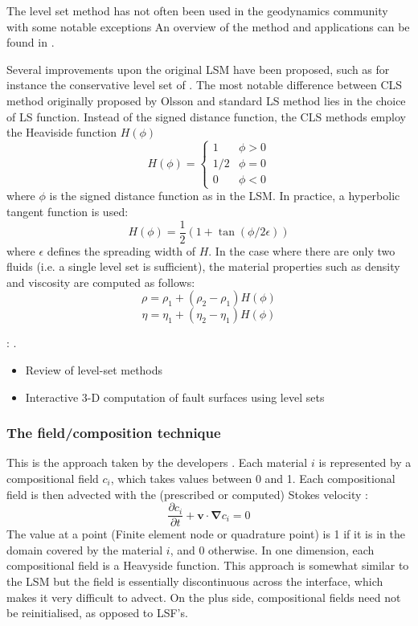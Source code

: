 The level set method has not often been used in the geodynamics 
community with some notable exceptions 
\cite{bomh06,bomh07,habm07,grbh07,zlfd08,hagr10,sunh10,suhe10,hitg14}
An overview of the method and applications can
be found in \cite{osfe01}.

Several improvements upon the original LSM have been proposed, 
such as for instance the conservative level set of \cite{zhbl14}.
The most notable difference between CLS method originally proposed by Olsson \etal \cite{olkr05,olkz07}
and standard LS method lies in the choice of LS function. Instead of the signed distance function, the
CLS methods employ the Heaviside function $H(\phi)$ 
\[
H(\phi)=
\left\{
\begin{array}{ll}
1 & \phi>0 \\
1/2 & \phi=0 \\
0 & \phi<0
\end{array}
\right.
\]
where $\phi$ is the signed distance function as in the LSM. 
In practice, a hyperbolic tangent function is used:
\[
H(\phi) = \frac{1}{2} (1+\tan (\phi/2\epsilon))
\]
where $\epsilon$ defines the spreading width of $H$. In the case where there are only 
two fluids (i.e. a single level set is sufficient), the material properties such as density and viscosity
are computed as follows:
\[
\rho=\rho_1+(\rho_2-\rho_1)H(\phi)
\]
\[
\eta=\eta_1+(\eta_2-\eta_1)H(\phi)
\]

\Literature: \cite{vasv05,vasv08,migi07,vasv05b}. 
\begin{itemize}
\item Review of level-set methods \cite{gifo18}
\item Interactive 3-D computation of fault surfaces using level sets \cite{kadt08}
\end{itemize}

\subsubsection{The field/composition technique \label{sec:compfield}}

This is the approach taken by the \aspect{} developers \cite{krhb12,hedg17}. 
Each material $i$ is represented by a compositional field $c_i$, 
which takes values between 0 and 1.
Each compositional field is then advected with the (prescribed or computed) Stokes velocity \cite{chri92}:
\begin{equation}
\frac{\partial c_i}{\partial t} + {\bm v}\cdot {\bm \nabla }c_i = 0
\end{equation}
The value at a point (Finite element node or quadrature point) is 1 if it is in the 
domain covered by the material $i$, and 0 otherwise.
In one dimension, each compositional field is a Heavyside function. 
This approach is somewhat similar to the LSM but the field is essentially 
discontinuous across the interface, which makes it very difficult to advect.  
On the plus side, compositional fields need not be reinitialised, as opposed to LSF's.

